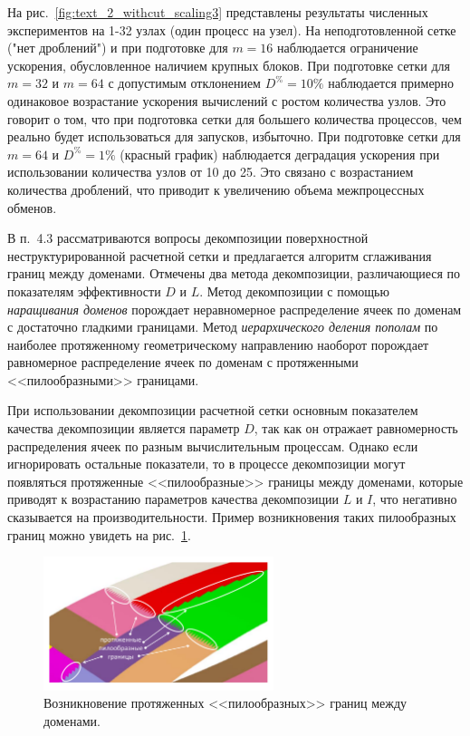 \documentclass[a4paper,14pt]{extarticle}                     %
\theoremstyle{plain}                                         %
\begin{document}
На рис.~\ref{fig:text_2_withcut_scaling3} представлены результаты численных экспериментов на 1-32 узлах (один процесс на узел).
На неподготовленной сетке ("нет дроблений") и при подготовке для $m = 16$ наблюдается ограничение ускорения, обусловленное наличием крупных блоков. 
При подготовке сетки для $m = 32$ и $m = 64$ с допустимым отклонением $D^{\%} = 10\%$ наблюдается примерно одинаковое возрастание ускорения вычислений с ростом количества узлов.
Это говорит о том, что при подготовка сетки для большего количества процессов, чем реально будет использоваться для запусков, избыточно.
При подготовке сетки для $m = 64$ и $D^{\%} = 1\%$ (красный график) наблюдается деградация ускорения при использовании количества узлов от 10 до 25.
Это связано с возрастанием количества дроблений, что приводит к увеличению объема межпроцессных обменов.


В п.~4.3 рассматриваются вопросы декомпозиции поверхностной неструктурированной расчетной сетки и предлагается алгоритм сглаживания границ между доменами.
Отмечены два метода декомпозиции, различающиеся по показателям эффективности $D$ и $L$.
Метод декомпозиции с помощью \textit{наращивания доменов} порождает неравномерное распределение ячеек по доменам с достаточно гладкими границами.
Метод \textit{иерархического деления пополам} по наиболее протяженному геометрическому направлению наоборот порождает равномерное распределение ячеек по доменам с протяженными <<пилообразными>> границами.

При использовании декомпозиции расчетной сетки основным показателем качества декомпозиции является параметр $D$, так как он отражает равномерность распределения ячеек по разным вычислительным процессам.
Однако если игнорировать остальные показатели, то в процессе декомпозиции могут появляться протяженные <<пилообразные>> границы между доменами, которые приводят к возрастанию параметров качества декомпозиции $L$ и $I$, что негативно сказывается на производительности.
Пример возникновения таких пилообразных границ можно увидеть на рис.~\ref{fig:text_2_smooth_bad_border}.

\begin{figure}[ht]
\centering
\includegraphics[width=0.6\textwidth]{./pics/text_2_smooth/bad-border.pdf}
\singlespacing
\caption{Возникновение протяженных <<пилообразных>> границ между доменами.}
\label{fig:text_2_smooth_bad_border}
\end{figure}
\end{document}
